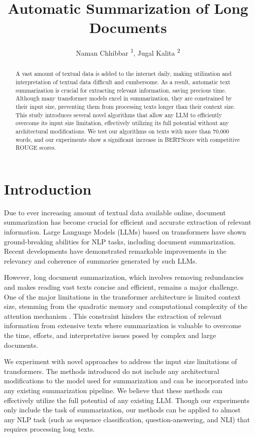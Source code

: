 \documentclass[letterpaper]{article} %
\title{Automatic Summarization of Long Documents}
\author{
  Naman Chhibbar \textsuperscript{\rm 1},
  Jugal Kalita \textsuperscript{\rm 2}
}
\begin{document}
\maketitle

\begin{abstract}
  A vast amount of textual data is added to the internet daily, making utilization
  and interpretation of textual data difficult and cumbersome.
  As a result, automatic text summarization is crucial for extracting relevant
  information, saving precious time.
  Although many transformer models excel in summarization, they are constrained
  by their input size, preventing them from processing texts longer than their
  context size.
  This study introduces several novel algorithms that allow any LLM to efficiently
  overcome its input size limitation, effectively utilizing its full potential without
  any architectural modifications.
  We test our algorithms on texts with more than 70,000 words, and our experiments show
  a significant increase in BERTScore with competitive ROUGE scores.
\end{abstract}


\section{Introduction}

  Due to ever increasing amount of textual data available online, document summarization
  has become crucial for efficient and accurate extraction of relevant information.
  Large Language Models (LLMs) based on transformers have shown ground-breaking abilities for
  NLP tasks, including document summarization.
  Recent developments have demonstrated remarkable improvements in the relevancy and
  coherence of summaries generated by such LLMs.

  However, long document summarization, which involves removing redundancies and makes reading
  vast texts concise and efficient, remains a major challenge.
  One of the major limitations in the transformer architecture is limited context size,
  stemming from the quadratic memory and computational complexity of the attention mechanism
  \cite{du2023improving}.
  This constraint hinders the extraction of relevant information from extensive texts where
  summarization is valuable to overcome the time, efforts, and interpretative issues posed by
  complex and large documents.

  We experiment with novel approaches to address the input size limitations of transformers.
  The methods introduced do not include any architectural modifications to the model
  used for summarization and can be incorporated into any existing summarization pipeline.
  We believe that these methods can effectively utilize the full potential of any existing LLM.
  Though our experiments only include the task of summarization, our methods can be applied
  to almost any NLP task (such as sequence classification, question-answering, and NLI) that
  requires processing long texts.
\end{document}
